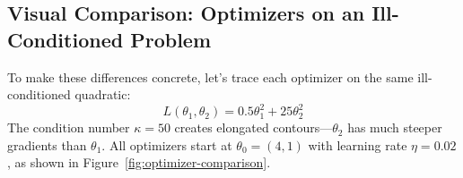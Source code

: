 \documentclass[../../main.tex]{subfiles}
\begin{document}
\subsection{Visual Comparison: Optimizers on an Ill-Conditioned Problem}

To make these differences concrete, let's trace each optimizer on the same ill-conditioned quadratic:
\begin{equation}
L(\theta_1, \theta_2) = 0.5\theta_1^2 + 25\theta_2^2
\end{equation}
The condition number $\kappa = 50$ creates elongated contours---$\theta_2$ has much steeper gradients than $\theta_1$. All optimizers start at $\theta_0 = (4, 1)$ with learning rate $\eta = 0.02$, as shown in Figure~\ref{fig:optimizer-comparison}.
\end{document}
